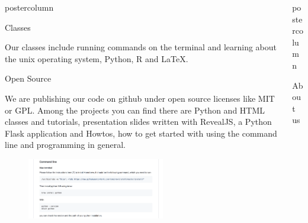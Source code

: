 \documentclass{beamer}
\newlength{\columnheight}
\begin{document}
\begin{frame}
\begin{columns}
\begin{column}{.33\textwidth}
\begin{beamercolorbox}[center,wd=\textwidth]{postercolumn}
\begin{minipage}[T]{.95\textwidth}
{\begin{myblock}{Classes}
\begin{addmargin}[1em]{1em}
                            Our classes include running commands on the terminal and learning about the unix operating system, Python, R and \LaTeX.
                        \end{addmargin}
                    \end{myblock}\vfill
                    \vspace{1.25cm}
					\begin{myblock}{Open Source}
					    \begin{addmargin}[1em]{1em}
                            We are publishing our code on github under open source licenses like MIT or GPL.
                            Among the projects you can find there are Python and HTML classes and tutorials, presentation slides written with RevealJS,
                            a Python Flask application and Howtos, how to get started with using the command line and programming in general.
                        \end{addmargin}
                        \begin{addmargin}[1em]{1em}
                            \begin{figure}
                                \vspace{1cm}
                                \centering\includegraphics[width=0.59\textwidth]{img/cmd.png}
                                \vspace{1cm}
                            \end{figure}
                        \end{addmargin}
                    \end{myblock}\vfill
		}\end{minipage}\end{beamercolorbox}
	\end{column}
  \begin{column}{.33\textwidth}
		\begin{beamercolorbox}[center,wd=\textwidth]{postercolumn}
			\begin{minipage}[T]{.95\textwidth}
				\parbox[t][\columnheight]{\textwidth}{
					\begin{myblock}{About us}

\end{myblock}}
\end{minipage}
\end{beamercolorbox}
\end{column}
\end{columns}
\end{frame}
\end{document}
